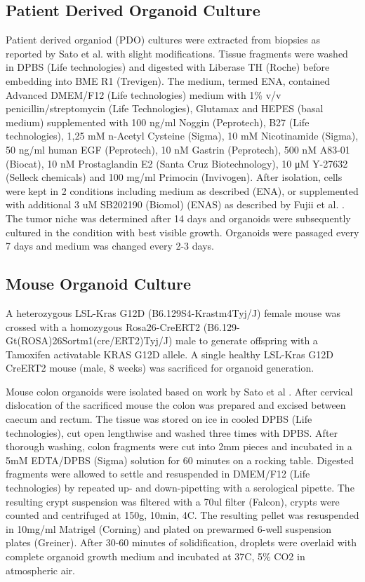 \begin{flushleft}
\subsection{Patient Derived Organoid Culture}
Patient derived organiod (PDO) cultures were extracted from biopsies as reported by Sato et al. \cite{Sato2011-lh} with slight modifications. Tissue fragments were washed in DPBS (Life technologies) and digested with Liberase TH (Roche) before embedding into BME R1 (Trevigen). The medium, termed ENA, contained Advanced DMEM/F12 (Life technologies) medium with 1\% v/v penicillin/streptomycin (Life Technologies), Glutamax and HEPES (basal medium) supplemented with 100 ng/ml Noggin (Peprotech), B27 (Life technologies), 1,25 mM n-Acetyl Cysteine (Sigma), 10 mM Nicotinamide (Sigma), 50 ng/ml human EGF (Peprotech), 10 nM Gastrin (Peprotech), 500 nM A83-01 (Biocat), 10 nM Prostaglandin E2 (Santa Cruz Biotechnology), 10 μM Y-27632 (Selleck chemicals) and 100 mg/ml Primocin (Invivogen). After isolation, cells were kept in 2 conditions including medium as described (ENA), or supplemented with additional 3 uM SB202190 (Biomol) (ENAS) as described by Fujii et al. \cite{Fujii2016ATumorigenesi  }. 
The tumor niche was determined after 14 days and organoids were subsequently cultured in the condition with best visible growth. 
Organoids were passaged every 7 days and medium was changed every 2-3 days.

\subsection{Mouse Organoid Culture}
A heterozygous LSL-Kras G12D (B6.129S4-Krastm4Tyj/J) female mouse was crossed with a homozygous Rosa26-CreERT2 (B6.129-Gt(ROSA)26Sortm1(cre/ERT2)Tyj/J) male to generate offspring with a Tamoxifen activatable KRAS G12D allele. A single healthy LSL-Kras G12D CreERT2 mouse (male, 8 weeks) was sacrificed for organoid generation. 

Mouse colon organoids were isolated based on work by Sato et al \cite{Sato2009-jw}. After cervical dislocation of the sacrificed mouse the colon was prepared and excised between caecum and rectum. The tissue was stored on ice in cooled DPBS (Life technologies), cut open lengthwise and washed three times with DPBS. After thorough washing, colon fragments were cut into 2mm pieces and incubated in a 5mM EDTA/DPBS (Sigma) solution for 60 minutes on a rocking table. Digested fragments were allowed to settle and resuspended in DMEM/F12 (Life technologies) by repeated up- and down-pipetting with a serological pipette. The resulting crypt suspension was filtered with a 70ul filter (Falcon), crypts were counted and centrifuged at 150g, 10min, 4C. The resulting pellet was resuspended in 10mg/ml Matrigel (Corning) and plated on prewarmed 6-well suspension plates (Greiner). After 30-60 minutes of solidification, droplets were overlaid with complete organoid growth medium and incubated at 37C, 5\% CO2 in atmospheric air.


\end{flushleft}
